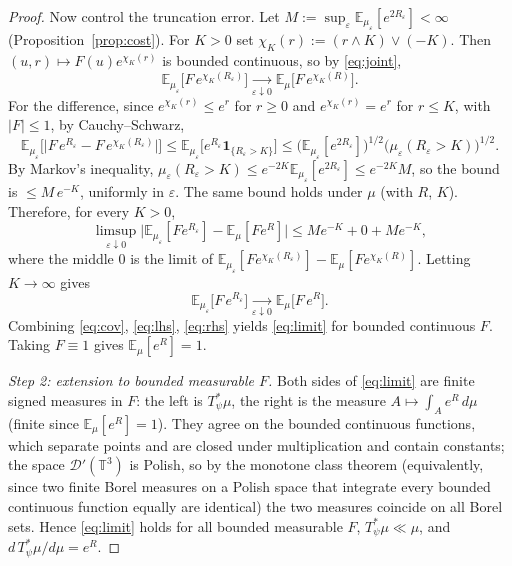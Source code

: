 \documentclass[12pt]{article}
\theoremstyle{definition}
\newcommand{\T}{\mathbb{T}^3}
\newcommand{\E}{\mathbb{E}}
\newcommand{\D}{\mathcal{D}'(\T)}
\begin{document}
\begin{proof}
Now control the truncation error. Let $M:=\sup_\varepsilon\E_{\mu_\varepsilon}[e^{2R_\varepsilon}]<\infty$
(Proposition~\ref{prop:cost}). For $K>0$ set $\chi_K(r):=(r\wedge K)\vee(-K)$. Then
$(u,r)\mapsto F(u)e^{\chi_K(r)}$ is bounded continuous, so by \eqref{eq:joint},
\[
  \E_{\mu_\varepsilon}\!\big[F\,e^{\chi_K(R_\varepsilon)}\big]
  \xrightarrow[\varepsilon\downarrow0]{}\E_\mu\!\big[F\,e^{\chi_K(R)}\big].
\]
For the difference, since $e^{\chi_K(r)}\le e^{r}$ for $r\ge0$ and $e^{\chi_K(r)}=e^{r}$
for $r\le K$, with $|F|\le1$, by Cauchy--Schwarz,
\[
  \E_{\mu_\varepsilon}\!\big[\big|F\,e^{R_\varepsilon}-F\,e^{\chi_K(R_\varepsilon)}\big|\big]
  \le\E_{\mu_\varepsilon}\!\big[e^{R_\varepsilon}\mathbf 1_{\{R_\varepsilon>K\}}\big]
  \le\big(\E_{\mu_\varepsilon}[e^{2R_\varepsilon}]\big)^{1/2}\big(\mu_\varepsilon(R_\varepsilon>K)\big)^{1/2}.
\]
By Markov's inequality, $\mu_\varepsilon(R_\varepsilon>K)\le e^{-2K}\E_{\mu_\varepsilon}[e^{2R_\varepsilon}]\le e^{-2K}M$,
so the bound is $\le M\,e^{-K}$, uniformly in $\varepsilon$. The same bound holds under
$\mu$ (with $R$, $K$). Therefore, for every $K>0$,
\[
  \limsup_{\varepsilon\downarrow0}\Big|\E_{\mu_\varepsilon}[F e^{R_\varepsilon}]-\E_\mu[Fe^{R}]\Big|
  \le M e^{-K}+0+M e^{-K},
\]
where the middle $0$ is the limit of $\E_{\mu_\varepsilon}[Fe^{\chi_K(R_\varepsilon)}]-\E_\mu[Fe^{\chi_K(R)}]$.
Letting $K\to\infty$ gives
\begin{equation}\label{eq:rhs}
  \E_{\mu_\varepsilon}\!\big[F\,e^{R_\varepsilon}\big]\xrightarrow[\varepsilon\downarrow0]{}\E_\mu\!\big[F\,e^{R}\big].
\end{equation}
Combining \eqref{eq:cov}, \eqref{eq:lhs}, \eqref{eq:rhs} yields \eqref{eq:limit} for
bounded continuous $F$. Taking $F\equiv1$ gives $\E_\mu[e^R]=1$.

\emph{Step 2: extension to bounded measurable $F$.}
Both sides of \eqref{eq:limit} are finite signed measures in $F$: the left is
$T_\psi^{*}\mu$, the right is the measure $A\mapsto\int_A e^{R}\,d\mu$ (finite since
$\E_\mu[e^R]=1$). They agree on the bounded continuous functions, which separate points
and are closed under multiplication and contain constants; the space $\D$ is Polish, so
by the monotone class theorem (equivalently, since two finite Borel measures on a Polish
space that integrate every bounded continuous function equally are identical) the two
measures coincide on all Borel sets. Hence \eqref{eq:limit} holds for all bounded
measurable $F$, $T_\psi^{*}\mu\ll\mu$, and $d\,T_\psi^{*}\mu/d\mu=e^{R}$.
\end{proof}
\end{document}
